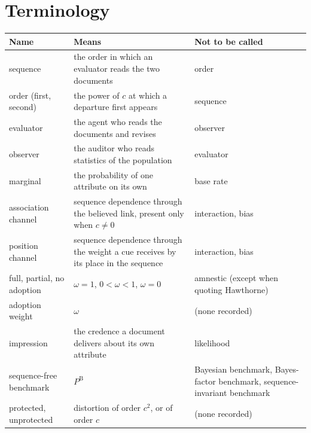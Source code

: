 \documentclass[11pt]{article}
\newcommand{\PB}{P^{\mathrm{B}}}
\begin{document}
\section*{Terminology}

\footnotesize
\begin{longtable}{@{}P{3.4cm}P{6.6cm}P{5.6cm}@{}}
\toprule
\textbf{Name} & \textbf{Means} & \textbf{Not to be called} \\
\midrule
sequence & the order in which an evaluator reads the two documents & order \\
order (first, second) & the power of $c$ at which a departure first appears &
  sequence \\
evaluator & the agent who reads the documents and revises & observer \\
observer & the auditor who reads statistics of the population & evaluator \\
marginal & the probability of one attribute on its own & base rate \\
association channel & sequence dependence through the believed link, present
  only when $c\neq0$ & interaction, bias \\
position channel & sequence dependence through the weight a cue receives by
  its place in the sequence & interaction, bias \\
full, partial, no adoption & $\omega=1$, $0<\omega<1$, $\omega=0$ & amnestic
  (except when quoting Hawthorne) \\
adoption weight & $\omega$ & (none recorded) \\
impression & the credence a document delivers about its own attribute &
  likelihood \\
sequence-free benchmark & $\PB$ & Bayesian benchmark, Bayes-factor benchmark,
  sequence-invariant benchmark \\
protected, unprotected & distortion of order $c^{2}$, or of order $c$ &
  (none recorded) \\
\bottomrule
\end{longtable}
\normalsize
\end{document}
